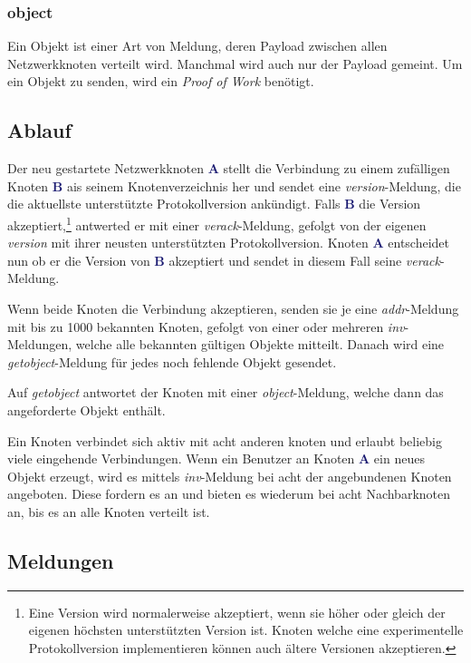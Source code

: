 \documentclass{bfh}
\newcommand{\msg}[1]{\textit{\textcolor{RedOrange}{#1}}}
\newcommand{\node}[1]{\textbf{\textcolor{MidnightBlue}{#1}}}
\begin{document}
  \subsubsection{object}
  Ein Objekt ist einer Art von Meldung, deren Payload zwischen allen Netzwerkknoten verteilt wird. Manchmal wird auch nur der Payload gemeint. Um ein Objekt zu senden, wird ein \textit{Proof of Work} benötigt.

  \subsection{Ablauf}

  Der neu gestartete Netzwerkknoten \node{A} stellt die Verbindung zu einem zufälligen Knoten \node{B} ais seinem Knotenverzeichnis her und sendet eine \msg{version}-Meldung, die die aktuellste unterstützte Protokollversion ankündigt. Falls \node{B} die Version akzeptiert,\footnote{Eine Version wird normalerweise akzeptiert, wenn sie höher oder gleich der eigenen höchsten unterstützten Version ist. Knoten welche eine experimentelle Protokollversion implementieren können auch ältere Versionen akzeptieren.} antwerted er mit einer \msg{verack}-Meldung, gefolgt von der eigenen \msg{version} mit ihrer neusten unterstützten Protokollversion. Knoten \node{A} entscheidet nun ob er die Version von \node{B} akzeptiert und sendet in diesem Fall seine \msg{verack}-Meldung.

  Wenn beide Knoten die Verbindung akzeptieren, senden sie je eine \msg{addr}-Meldung mit bis zu 1000 bekannten Knoten, gefolgt von einer oder mehreren \msg{inv}-Meldungen, welche alle bekannten gültigen Objekte mitteilt. Danach wird eine \msg{getobject}-Meldung für jedes noch fehlende Objekt gesendet.

  Auf \msg{getobject} antwortet der Knoten mit einer \msg{object}-Meldung, welche dann das angeforderte Objekt enthält.

  Ein Knoten verbindet sich aktiv mit acht anderen knoten und erlaubt beliebig viele eingehende Verbindungen. Wenn ein Benutzer an Knoten \node{A} ein neues Objekt erzeugt, wird es mittels \msg{inv}-Meldung bei acht der angebundenen Knoten angeboten. Diese fordern es an und bieten es wiederum bei acht Nachbarknoten an, bis es an alle Knoten verteilt ist.

  \subsection{Meldungen}
\end{document}
